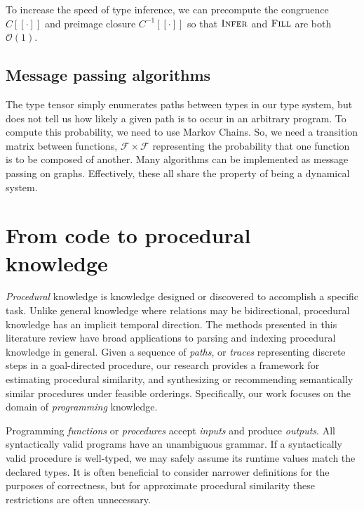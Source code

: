 \documentclass[11pt]{article}
\begin{document}
    To increase the speed of type inference, we can precompute the congruence $C[\![\cdot]\!]$ and preimage closure $C^{-1}[\![\cdot]\!]$ so that $\textsc{Infer}$ and $\textsc{Fill}$ are both $\mathcal{O}(1)$.

    \subsection{Message passing algorithms}\label{subsec:message-passing-algorithms}

    The type tensor simply enumerates paths between types in our type system, but does not tell us how likely a given path is to occur in an arbitrary program. To compute this probability, we need to use Markov Chains. So, we need a transition matrix between functions, $\mathcal{F}\times\mathcal{F}$ representing the probability that one function is to be composed of another. Many algorithms can be implemented as message passing on graphs. Effectively, these all share the property of being a dynamical system.

    \pagebreak\section{From code to procedural knowledge}\label{sec:applications}

    \textit{Procedural} knowledge is knowledge designed or discovered to accomplish a specific task. Unlike general knowledge where relations may be bidirectional, procedural knowledge has an implicit temporal direction. The methods presented in this literature review have broad applications to parsing and indexing procedural knowledge in general. Given a sequence of \textit{paths}, or \textit{traces} representing discrete steps in a goal-directed procedure, our research provides a framework for estimating procedural similarity, and synthesizing or recommending semantically similar procedures under feasible orderings. Specifically, our work focuses on the domain of \textit{programming} knowledge.

    Programming \textit{functions} or \textit{procedures} accept \textit{inputs} and produce \textit{outputs}. All syntactically valid programs have an unambiguous grammar. If a syntactically valid procedure is well-typed, we may safely assume its runtime values match the declared types. It is often beneficial to consider narrower definitions for the purposes of correctness, but for approximate procedural similarity these restrictions are often unnecessary.
\end{document}
